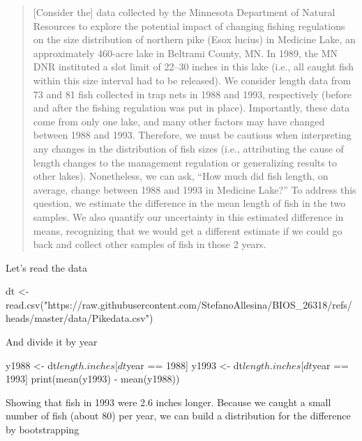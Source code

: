 \documentclass[
  letterpaper,
  DIV=11,
  numbers=noendperiod]{scrreprt}
\newenvironment{Shaded}{\begin{snugshade}}{\end{snugshade}}
\newcommand{\NormalTok}[1]{\textcolor[rgb]{0.00,0.23,0.31}{#1}}
\begin{document}
\begin{quote}
{[}Consider the{]} data collected by the Minnesota Department of Natural
Resources to explore the potential impact of changing fishing
regulations on the size distribution of northern pike (Esox lucius) in
Medicine Lake, an approximately 460-acre lake in Beltrami County, MN. In
1989, the MN DNR instituted a slot limit of 22--30 inches in this lake
(i.e., all caught fish within this size interval had to be released). We
consider length data from 73 and 81 fish collected in trap nets in 1988
and 1993, respectively (before and after the fishing regulation was put
in place). Importantly, these data come from only one lake, and many
other factors may have changed between 1988 and 1993. Therefore, we must
be cautious when interpreting any changes in the distribution of fish
sizes (i.e., attributing the cause of length changes to the management
regulation or generalizing results to other lakes). Nonetheless, we can
ask, ``How much did fish length, on average, change between 1988 and
1993 in Medicine Lake?'' To address this question, we estimate the
difference in the mean length of fish in the two samples. We also
quantify our uncertainty in this estimated difference in means,
recognizing that we would get a different estimate if we could go back
and collect other samples of fish in those 2 years.
\end{quote}

Let's read the data

\begin{Shaded}
\begin{Highlighting}[]
\NormalTok{dt \textless{}{-} read.csv("https://raw.githubusercontent.com/StefanoAllesina/BIOS\_26318/refs/heads/master/data/Pikedata.csv")}
\end{Highlighting}
\end{Shaded}

And divide it by year

\begin{Shaded}
\begin{Highlighting}[]
\NormalTok{y1988 \textless{}{-} dt$length.inches[dt$year == 1988]}
\NormalTok{y1993 \textless{}{-} dt$length.inches[dt$year == 1993]}
\NormalTok{print(mean(y1993) {-} mean(y1988))}
\end{Highlighting}
\end{Shaded}

Showing that fish in 1993 were 2.6 inches longer. Because we caught a
small number of fish (about 80) per year, we can build a distribution
for the difference by bootstrapping
\end{document}
